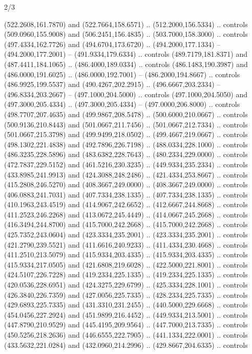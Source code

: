 \begin{flagdescription}{2/3}
\begin{scope}[xshift=0.5\flaglength,yshift=0.5\flagwidth,scale=\flagwidth/525.28]
\begin{scope}[y=0.1mm, x=0.1mm, yscale=-1,shift={(-381.5,-404)}]
\begin{scope}[shift={(5.25001,4.53053)},miter limit=4.00,line width=0.800\lw]
  (522.2608,161.7870) and (522.7664,158.6571) .. (512.2000,156.5334) .. controls
  (509.0960,155.9008) and (506.2451,156.4835) .. (503.7000,158.3000) .. controls
  (497.4334,162.7726) and (494.6704,173.6720) .. (494.2000,177.1334) --
  (494.2000,177.2001) -- (491.9334,179.6334) .. controls (489.7179,181.8371) and
  (487.4411,184.1065) .. (486.4000,189.0334) .. controls (486.1483,190.3987) and
  (486.0000,191.6025) .. (486.0000,192.7001) -- (486.2000,194.8667) .. controls
  (486.9925,199.5537) and (490.4267,202.2915) .. (496.6667,203.2334) --
  (496.8334,203.2667) -- (497.1000,204.5000) .. controls (497.1000,204.5050) and
  (497.3000,205.4334) .. (497.3000,205.4334) -- (497.0000,206.8000) .. controls
  (498.7707,207.4635) and (499.9867,208.5478) .. (500.6000,210.0667) .. controls
  (500.9136,210.8443) and (501.0667,211.7456) .. (501.0667,212.7334) .. controls
  (501.0667,215.3798) and (499.9499,218.0502) .. (499.4667,219.0667) .. controls
  (498.1302,221.4838) and (492.7896,226.7198) .. (488.0334,228.1000) .. controls
  (486.3235,228.5896) and (483.6382,228.7643) .. (480.2334,229.0000) .. controls
  (472.7837,229.5152) and (461.5216,230.3235) .. (449.9334,235.2334) .. controls
  (433.8985,241.9913) and (424.3088,248.2486) .. (421.4334,253.8667) .. controls
  (415.2808,246.5270) and (408.3667,249.0000) .. (408.3667,249.0000) .. controls
  (406.0883,241.7031) and (407.7334,238.1335) .. (407.7334,238.1335) .. controls
  (410.1963,243.4519) and (414.9067,242.6652) .. (412.6667,244.8668) .. controls
  (411.2523,246.2268) and (413.0672,245.4449) .. (414.0667,245.2668) .. controls
  (416.3494,244.8700) and (415.7000,242.2668) .. (415.7000,242.2668) .. controls
  (425.7352,243.0604) and (423.3334,235.2001) .. (423.3334,235.2001) .. controls
  (421.2790,239.5521) and (411.6616,240.9233) .. (411.4334,230.4668) .. controls
  (411.2510,213.5079) and (415.9334,203.4335) .. (415.9334,203.4335) .. controls
  (415.9334,217.0505) and (421.6808,219.6028) .. (422.5000,221.8001) .. controls
  (424.5107,226.7228) and (419.2334,225.1335) .. (419.2334,225.1335) .. controls
  (420.0536,228.6951) and (424.3275,229.6799) .. (425.3334,228.1001) .. controls
  (426.3840,226.7359) and (427.0056,225.7335) .. (428.2334,225.7335) .. controls
  (429.6893,225.7335) and (431.3310,231.2455) .. (440.5000,229.6668) .. controls
  (454.0456,227.2924) and (451.9899,216.4452) .. (449.9334,213.5001) .. controls
  (447.8790,210.9529) and (445.4195,209.9564) .. (447.7000,213.7335) .. controls
  (450.5256,218.2636) and (446.6555,222.7905) .. (441.1334,222.0001) .. controls
  (433.5632,221.0284) and (432.0960,214.2996) .. (429.8667,204.6335) .. controls

\end{scope}
\end{scope}
\end{scope}
\end{flagdescription}
